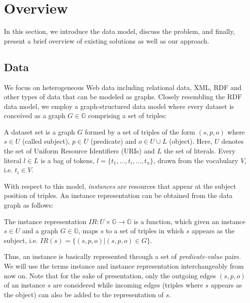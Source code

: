 \section{Overview}
In this section, we introduce the data model, discuss the problem, and finally, present a brief overview of existing solutions as well as our approach.

\subsection{Data} We focus on heterogeneous Web data including relational data, XML, RDF and other types of data that can be modeled as graphs. Closely resembling the RDF data model, we employ a graph-structured data model where every dataset is conceived as a graph $G \in\mathbb{G}$ comprising a set of triples: 

\begin{definition} A dataset set is a graph $G$ formed by a set of triples of the form $(s, p, o)$ where $s \in U$ (called subject), $p \in U$ (predicate) and $o \in U \cup L$ (object). Here, $U$ denotes the set of Uniform Resource Identifiers (URIs) and $L$ the set of literals. Every literal $l \in L$ is a bag of tokens, $l = \{t_1,\ldots,t_i,\ldots,t_n\}$, drawn from the vocabulary $V$, i.e. $t_i \in V$.  
\end{definition} 

With respect to this model, \emph{instances} are resources that appear at the subject position of triples. An instance representation can be obtained from the data graph as follows:

\begin{definition} The instance representation $IR: U \times \mathbb{G} \rightarrow \mathbb{G}$ is a function, which given an instance $s \in U$ and a graph $G \in \mathbb{G}$, maps $s$ to a set of triples in which $s$ appears as the subject, i.e. $IR(s) = \{ (s, p, o) | (s, p, o) \in G \}$. 
\end{definition} 

Thus, an instance is basically represented through a set of \emph{predicate-value} pairs.  
We will use the terms instance and instance representation interchangeably from now on. Note that for the sake of presentation, only the outgoing edges $(s, p, o)$ of an instance $s$ are considered while incoming edges (triples where $s$ appears as the object) can also be added to the representation of $s$. 

